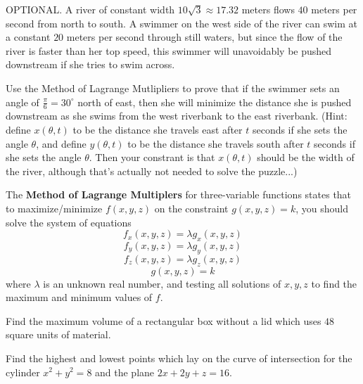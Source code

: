 \documentclass[letterpaper, twoside, 12pt]{book}
\begin{document}
          \begin{problem}
            OPTIONAL.
            A river of constant width $10\sqrt{3}\approx 17.32$ meters
            flows $40$ meters per second from north to south. A swimmer
            on the west side of the river can swim at a constant
            $20$ meters per second through still waters, but since the flow
            of the river is faster than her top speed, this swimmer will
            unavoidably be pushed downstream if she tries to swim across.

            Use the Method of Lagrange Mutlipliers to prove that if
            the swimmer sets an angle of $\frac{\pi}{6}=30^\circ$ north of
            east, then she will minimize the distance she is pushed downstream
            as she swims from the west riverbank to the east riverbank.
            (Hint: define $x(\theta,t)$ to be the distance she travels east
            after $t$ seconds if she sets the angle $\theta$, and define
            $y(\theta,t)$ to be the distance she travels south
            after $t$ seconds if she sets the angle $\theta$. Then your
            constrant is that $x(\theta,t)$ should be the width of the river,
            although that's actually not needed to solve the puzzle...)
          \end{problem}

          \begin{solution}

          \end{solution}

\begin{theorem}
  The \textbf{Method of Lagrange Multiplers} for three-variable functions
  states that to maximize/minimize $f(x,y,z)$ on the constraint $g(x,y,z)=k$,
  you should solve the system of equations
    \[
      f_x(x,y,z)=\lambda g_x(x,y,z)
    \]
    \[
      f_y(x,y,z)=\lambda g_y(x,y,z)
    \]
    \[
      f_z(x,y,z)=\lambda g_z(x,y,z)
    \]
    \[
      g(x,y,z)=k
    \]
  where $\lambda$ is an unknown real number,
  and testing all solutions of $x,y,z$ to find the maximum
  and minimum values of $f$.
\end{theorem}

          \begin{problem}
            Find the maximum volume of a rectangular box without a lid
            which uses $48$ square units of material.
          \end{problem}

          \begin{solution}

          \end{solution}

          \begin{problem}
            Find the highest and lowest points which lay on the curve of intersection for the cylinder $x^2+y^2=8$ and the plane
            $2x+2y+z=16$.
          \end{problem}

          \begin{solution}

          \end{solution}
\end{document}
